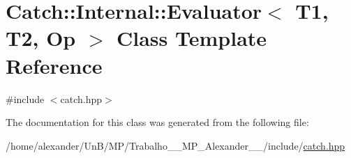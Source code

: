 \hypertarget{classCatch_1_1Internal_1_1Evaluator}{\section{Catch\-:\-:Internal\-:\-:Evaluator$<$ T1, T2, Op $>$ Class Template Reference}
\label{classCatch_1_1Internal_1_1Evaluator}
}


{\ttfamily \#include $<$catch.\-hpp$>$}



The documentation for this class was generated from the following file\-:\begin{DoxyCompactItemize}
\item 
/home/alexander/\-Un\-B/\-M\-P/\-Trabalho\-\_\-\_\-\-M\-P\-\_\-\-Alexander\-\_\-\_/include/\hyperlink{catch_8hpp}{catch.\-hpp}\end{DoxyCompactItemize}

